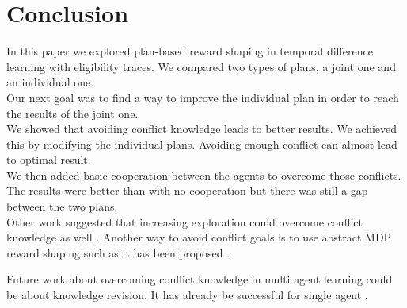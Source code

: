 \documentclass[letterpaper]{article}
\begin{document}
\section{Conclusion}
In this paper we explored plan-based reward shaping in temporal difference learning with eligibility traces. We compared two types of plans, a joint one and an individual one.\\

Our next goal was to find a way to improve the individual plan in order to reach the results of the joint one.\\
We showed that avoiding conflict knowledge leads to better results. We achieved this by modifying the individual plans. Avoiding enough conflict can almost lead to optimal result.\\
We then added basic cooperation between the agents to overcome those conflicts. The results were better than with no cooperation but there was still a gap between the two plans.\\

Other work suggested that increasing exploration could overcome conflict knowledge as well \citep{paper4}. Another way to avoid conflict goals is to use abstract MDP reward shaping such as it has been proposed \citep{abstractmdp}.

Future work about overcoming conflict knowledge in multi agent learning could be about knowledge revision. It has already be successful for single agent \citep{efthymiadis2014knowledge}.



\footnotesize


\end{document}
